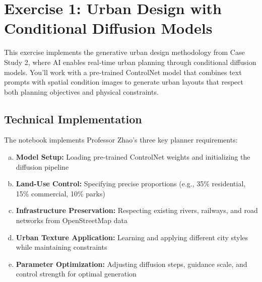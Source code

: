 \documentclass[11pt]{article}
\begin{document}
\section*{Exercise 1: Urban Design with Conditional Diffusion Models}

\begin{center}
\end{center}

This exercise implements the generative urban design methodology from Case Study 2, where AI enables real-time urban planning through conditional diffusion models. You'll work with a pre-trained ControlNet model that combines text prompts with spatial condition images to generate urban layouts that respect both planning objectives and physical constraints.

\subsection*{Technical Implementation}

The notebook implements Professor Zhao's three key planner requirements:
\begin{enumerate}[(a)]
\item \textbf{Model Setup:} Loading pre-trained ControlNet weights and initializing the diffusion pipeline
\item \textbf{Land-Use Control:} Specifying precise proportions (e.g., 35\% residential, 15\% commercial, 10\% parks)
\item \textbf{Infrastructure Preservation:} Respecting existing rivers, railways, and road networks from OpenStreetMap data
\item \textbf{Urban Texture Application:} Learning and applying different city styles while maintaining constraints
\item \textbf{Parameter Optimization:} Adjusting diffusion steps, guidance scale, and control strength for optimal generation
\end{enumerate}
\end{document}
